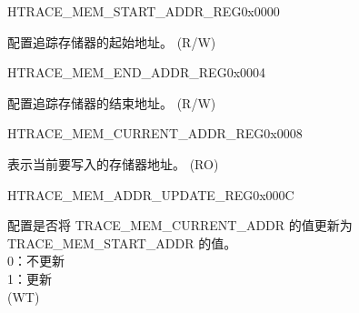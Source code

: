 \begin{register}{H}{TRACE\_MEM\_START\_ADDR\_REG}{0x0000}\label{regdesc:TRACEMEMSTARTADDRREG}
%
\regnewline%
\begin{regdesc}\begin{reglist}
\label{fielddesc:TRACEMEMSTARTADDR}\item [TRACE\_MEM\_START\_ADDR] 配置追踪存储器的起始地址。 (R/W)
\end{reglist}\end{regdesc}
\end{register}


\begin{register}{H}{TRACE\_MEM\_END\_ADDR\_REG}{0x0004}\label{regdesc:TRACEMEMENDADDRREG}
%
\regnewline%
\begin{regdesc}\begin{reglist}
\label{fielddesc:TRACEMEMENDADDR}\item [TRACE\_MEM\_END\_ADDR] 配置追踪存储器的结束地址。 (R/W)
\end{reglist}\end{regdesc}
\end{register}


\begin{register}{H}{TRACE\_MEM\_CURRENT\_ADDR\_REG}{0x0008}\label{regdesc:TRACEMEMCURRENTADDRREG}
%
\regnewline%
\begin{regdesc}\begin{reglist}
\label{fielddesc:TRACEMEMCURRENTADDR}\item [TRACE\_MEM\_CURRENT\_ADDR] 表示当前要写入的存储器地址。 (RO)
\end{reglist}\end{regdesc}
\end{register}


\begin{register}{H}{TRACE\_MEM\_ADDR\_UPDATE\_REG}{0x000C}\label{regdesc:TRACEMEMADDRUPDATEREG}
%
%
\regnewline%
\begin{regdesc}\begin{reglist}
\label{fielddesc:TRACEMEMCURRENTADDRUPDATE}\item [TRACE\_MEM\_CURRENT\_ADDR\_UPDATE] 配置是否将 TRACE\_MEM\_CURRENT\_ADDR 的值更新为 TRACE\_MEM\_START\_ADDR 的值。\\
0：不更新\\
1：更新\\ (WT)
\end{reglist}\end{regdesc}
\end{register}


